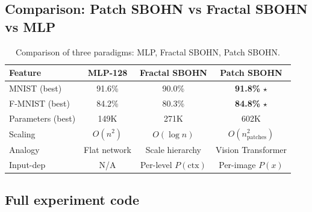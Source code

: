 \documentclass[11pt,a4paper]{report}
\begin{document}
\subsection{Comparison: Patch SBOHN vs Fractal SBOHN vs MLP}

\begin{table}[h]
\centering
\caption{Comparison of three paradigms: MLP, Fractal SBOHN, Patch SBOHN.}
\begin{tabular}{lccc}
\hline
\textbf{Feature} & \textbf{MLP-128} & \textbf{Fractal SBOHN} & \textbf{Patch SBOHN} \\
\hline
MNIST (best) & 91.6\% & 90.0\% & \textbf{91.8\%} $\star$ \\
F-MNIST (best) & 84.2\% & 80.3\% & \textbf{84.8\%} $\star$ \\
Parameters (best) & 149K & 271K & 602K \\
Scaling & $O(n^2)$ & $O(\log n)$ & $O(n_{\mathrm{patches}}^2)$ \\
Analogy & Flat network & Scale hierarchy & Vision Transformer \\
Input-dep & N/A & Per-level $P(\mathrm{ctx})$ & Per-image $P(x)$ \\
\hline
\end{tabular}
\end{table}

\subsection{Full experiment code}
\end{document}
